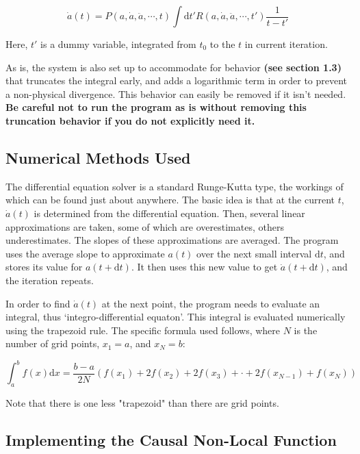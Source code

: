 \documentclass{article}
\def\D{\mathrm{d}} %
\begin{document}
\begin{equation}
\dot{a}(t) = P(a, \dot{a}, \ddot{a}, \cdots, t) \int \D t' R(a, \dot{a}, \ddot{a}, \cdots, t') \frac{1}{t - t'} 
\end{equation}

Here, \( t' \) is a dummy variable, integrated from \( t_0 \) to the \( t \) in current iteration. 

As is, the system is also set up to accommodate for behavior \textbf{(see section 1.3)} that truncates the integral early, and adds a logarithmic term in order to prevent a non-physical divergence. This behavior can easily be removed if it isn't needed. \textbf{Be careful not to run the program as is without removing this truncation behavior if you do not explicitly need it.}



\subsection{Numerical Methods Used}

The differential equation solver is a standard Runge-Kutta type, the workings of which can be found just about anywhere. The basic idea is that at the current \( t \), \( \dot{a}(t) \) is determined from the differential equation. Then, several linear approximations are taken, some of which are overestimates, others underestimates. The slopes of these approximations are averaged. The program uses the average slope to approximate \( a(t) \) over the next small interval \( \D t \), and stores its value for \( a(t + \D t) \). It then uses this new value to get \( \dot{a}(t + \D t) \), and the iteration repeats. 

In order to find \( \dot{a}(t) \) at the next point, the program needs to evaluate an integral, thus `integro-differential equaton'. This integral is evaluated numerically using the trapezoid rule. The specific formula used follows, where \( N \) is the number of grid points, \( x_1 = a \), and \( x_N = b \):

\begin{equation}
\int_a^b f(x) \D x = \frac{b - a}{2N}( f(x_1) + 2f(x_2) + 2f(x_3) + \cdot + 2f(x_{N-1}) + f(x_N))
\end{equation}

Note that there is one less "trapezoid" than there are grid points. 

\subsection{Implementing the Causal Non-Local Function}
\end{document}
